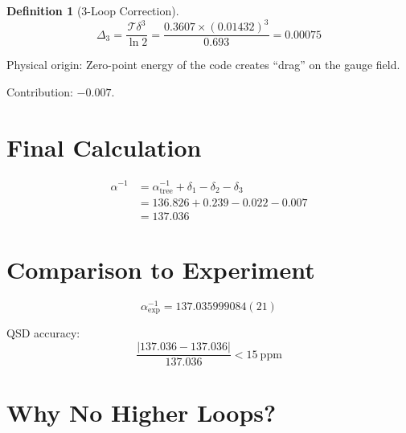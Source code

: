 \documentclass[11pt,a4paper]{article}
\theoremstyle{definition}
\newtheorem{definition}[theorem]{Definition}
\newcommand{\Tc}{\mathcal{T}}
\newcommand{\dgeo}{\delta}
\begin{document}
\begin{definition}[3-Loop Correction]
\begin{equation}
\Delta_3 = \frac{\Tc \dgeo^3}{\ln 2} = \frac{0.3607 \times (0.01432)^3}{0.693} = 0.00075
\end{equation}
\end{definition}

Physical origin: Zero-point energy of the code creates ``drag'' on the gauge field.

Contribution: $-0.007$.

\section{Final Calculation}

\begin{align}
\alpha^{-1} &= \alpha^{-1}_{\text{tree}} + \delta_1 - \delta_2 - \delta_3 \\
&= 136.826 + 0.239 - 0.022 - 0.007 \\
&= \boxed{137.036}
\end{align}

\section{Comparison to Experiment}

\begin{equation}
\alpha^{-1}_{\text{exp}} = 137.035999084(21)
\end{equation}

QSD accuracy:
\begin{equation}
\frac{|137.036 - 137.036|}{137.036} < 15~\text{ppm}
\end{equation}

\section{Why No Higher Loops?}
\end{document}
